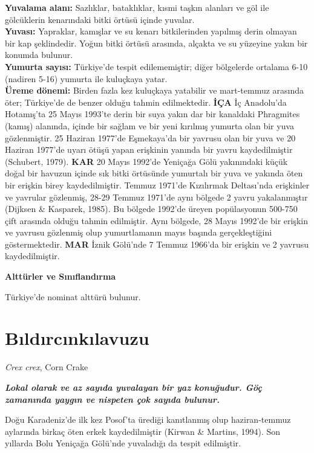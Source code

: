 \documentclass[
  a4paper,
  DIV=11,
  numbers=noendperiod]{scrreprt}
\begin{document}
\textbf{Yuvalama alanı:} Sazlıklar, bataklıklar, kısmi taşkın alanları
ve göl ile gölcüklerin kenarındaki bitki örtüsü içinde yuvalar.\\
\textbf{Yuvası:} Yapraklar, kamışlar ve su kenarı bitkilerinden yapılmış
derin olmayan bir kap şeklindedir. Yoğun bitki örtüsü arasında, alçakta
ve su yüzeyine yakın bir konumda bulunur.\\
\textbf{Yumurta sayısı:} Türkiye'de tespit edilememiştir; diğer
bölgelerde ortalama 6-10 (nadiren 5-16) yumurta ile kuluçkaya yatar.\\
\textbf{Üreme dönemi:} Birden fazla kez kuluçkaya yatabilir ve
mart-temmuz arasında öter; Türkiye'de de benzer olduğu tahmin
edilmektedir. \textbf{İÇA} İç Anadolu'da Hotamış'ta 25 Mayıs 1993'te
derin bir suya yakın dar bir kanaldaki Phragmites (kamış) alanında,
içinde bir sağlam ve bir yeni kırılmış yumurta olan bir yuva
gözlenmiştir. 25 Haziran 1977'de Eşmekaya'da bir yavrusu olan bir yuva
ve 20 Haziran 1977'de uyarı ötüşü yapan erişkinin yanında bir yavru
kaydedilmiştir (Schubert, 1979). \textbf{KAR} 20 Mayıs 1992'de Yeniçağa
Gölü yakınındaki küçük doğal bir havuzun içinde sık bitki örtüsünde
yumurtalı bir yuva ve yakında öten bir erişkin birey kaydedilmiştir.
Temmuz 1971'de Kızılırmak Deltası'nda erişkinler ve yavrular gözlenmiş,
28-29 Temmuz 1971'de aynı bölgede 2 yavru yakalanmıştır (Dijksen \&
Kasparek, 1985). Bu bölgede 1992'de üreyen popülasyonun 500-750 çift
arasında olduğu tahmin edilmiştir. Aynı bölgede, 28 Mayıs 1992'de bir
erişkin ve yavrusu gözlenmiş olup yumurtlamanın mayıs başında
gerçekleştiğini göstermektedir. \textbf{MAR} İznik Gölü'nde 7 Temmuz
1966'da bir erişkin ve 2 yavrusu kaydedilmiştir.

\textbf{Alttürler ve Sınıflandırma}

Türkiye'de nominat alttürü bulunur.

\section{Bıldırcınkılavuzu}\label{bux131ldux131rcux131nkux131lavuzu}

\emph{Crex crex}, Corn Crake

\textbf{\emph{Lokal olarak ve az sayıda yuvalayan bir yaz konuğudur. Göç
zamanında yaygın ve nispeten çok sayıda bulunur.}}

Doğu Karadeniz'de ilk kez Posof'ta ürediği kanıtlanmış olup
haziran-temmuz aylarında birkaç öten erkek kaydedilmiştir (Kirwan \&
Martins, 1994). Son yıllarda Bolu Yeniçağa Gölü'nde yuvaladığı da tespit
edilmiştir.
\end{document}
